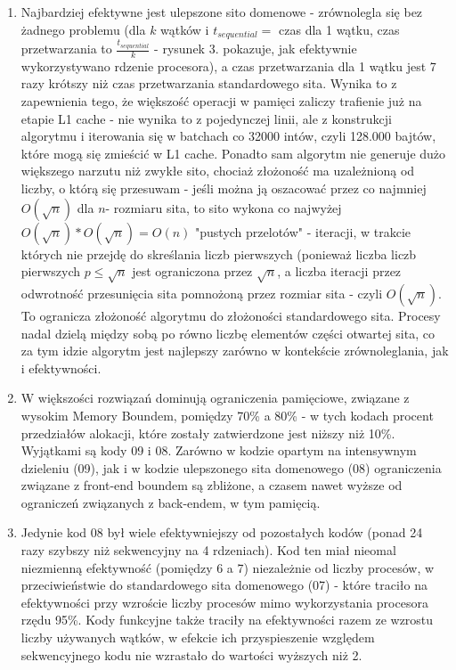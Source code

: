 \documentclass[12pt]{article}
\begin{document}
\begin{enumerate}
	\item Najbardziej efektywne jest ulepszone sito domenowe - zrównolegla się bez żadnego problemu (dla \(k\) wątków i \(t_{sequential} =\) czas dla 1 wątku, czas przetwarzania to \(\frac{t_{sequential}}{k}\) - rysunek 3. pokazuje, jak efektywnie wykorzystywano rdzenie procesora), a czas przetwarzania dla 1 wątku jest 7 razy krótszy niż czas przetwarzania standardowego sita. Wynika to z zapewnienia tego, że większość operacji w pamięci zaliczy trafienie już na etapie L1 cache - nie wynika to z pojedynczej linii, ale z konstrukcji algorytmu i iterowania się w batchach co 32000 intów, czyli 128.000 bajtów, które mogą się zmieścić w L1 cache. Ponadto sam algorytm nie generuje dużo większego narzutu niż zwykłe sito, chociaż złożoność ma uzależnioną od liczby, o którą się przesuwam - jeśli można ją oszacować przez co najmniej \(O(\sqrt{n})\) dla \(n\)- rozmiaru sita, to sito wykona co najwyżej \(O(\sqrt{n})*O(\sqrt{n})=O(n)\) "pustych przelotów" - iteracji, w trakcie których nie przejdę do skreślania liczb pierwszych (ponieważ liczba liczb pierwszych \(p\le\sqrt{n}\) jest ograniczona przez \(\sqrt{n}\), a liczba iteracji przez odwrotność przesunięcia sita pomnożoną przez rozmiar sita - czyli \(O(\sqrt{n})\). To ogranicza złożoność algorytmu do złożoności standardowego sita. Procesy nadal dzielą między sobą po równo liczbę elementów części otwartej sita, co za tym idzie algorytm jest najlepszy zarówno w kontekście zrównoleglania, jak i efektywności.
	
	\item W większości rozwiązań dominują ograniczenia pamięciowe, związane z wysokim Memory Boundem, pomiędzy 70\% a 80\% - w tych kodach procent przedziałów alokacji, które zostały zatwierdzone jest niższy niż 10\%. Wyjątkami są kody 09 i 08. Zarówno w kodzie opartym na intensywnym dzieleniu (09), jak i w kodzie ulepszonego sita domenowego (08) ograniczenia związane z front-end boundem są zbliżone, a czasem nawet wyższe od ograniczeń związanych z back-endem, w tym pamięcią.
	
	\item Jedynie kod 08 był wiele efektywniejszy od pozostałych kodów (ponad 24 razy szybszy niż sekwencyjny na 4 rdzeniach). Kod ten miał nieomal niezmienną efektywność (pomiędzy 6 a 7) niezależnie od liczby procesów, w przeciwieństwie do standardowego sita domenowego (07) - które traciło na efektywności przy wzroście liczby procesów mimo wykorzystania procesora rzędu 95\%. Kody funkcyjne także traciły na efektywności razem ze wzrostu liczby używanych wątków, w efekcie ich przyspieszenie względem sekwencyjnego kodu nie wzrastało do wartości wyższych niż 2.
\end{enumerate}
\end{document}
